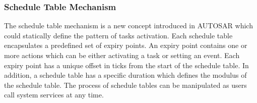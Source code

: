 \documentclass[sigconf]{acmart}
\begin{document}
\subsubsection{Schedule Table Mechanism}

The schedule table mechanism is a new concept introduced in AUTOSAR which could statically define the pattern of tasks activation. Each schedule table encapsulates a predefined set of expiry points. An expiry point contains one or more actions which can be either activating a task or setting an event. Each expiry point has a unique offset in ticks from the start of the schedule table. In addition, a schedule table has a specific duration which defines the modulus of the schedule table. The process of schedule tables can be manipulated as users call system services at any time.




\end{document}
